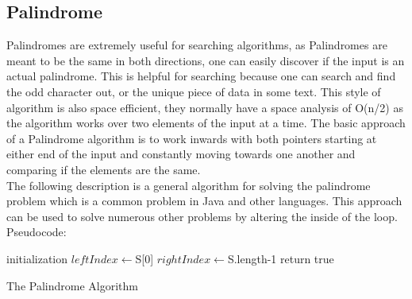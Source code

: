 \documentclass[10pt,twocolumn]{IEEEtran}
\begin{document}
\subsection{Palindrome}
Palindromes are extremely useful for searching algorithms, as Palindromes are meant to be the same in both directions, one can easily discover if the input is an actual palindrome. This is helpful for searching because one can search and find the odd character out, or the unique piece of data in some text. This style of algorithm is also space efficient, they normally have a space analysis of O(n/2) as the algorithm works over two elements of the input at a time. The basic approach of a Palindrome algorithm is to work inwards with both pointers starting at either end of the input and constantly moving towards one another and comparing if the elements are the same.\\  
The following description is a general algorithm for solving the palindrome problem which is a common problem in Java and other languages. This approach can be used to solve numerous other problems by altering the inside of the loop.
Pseudocode:
\IncMargin{1em}
\begin{algorithm}
	\SetAlgoLined
	initialization\;
	$leftIndex  \longleftarrow $S[0]\;
	$rightIndex \longleftarrow $S.length-1\;
return true\;
\caption{The Palindrome Algorithm}
\end{algorithm}\DecMargin{1em}
\end{document}
